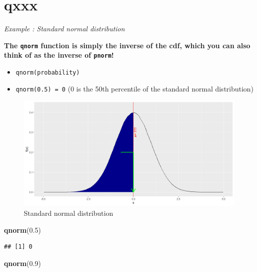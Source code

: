 \documentclass[
]{book}
\newenvironment{Shaded}{\begin{snugshade}}{\end{snugshade}}
\newcommand{\FloatTok}[1]{\textcolor[rgb]{0.00,0.00,0.81}{#1}}
\newcommand{\FunctionTok}[1]{\textcolor[rgb]{0.13,0.29,0.53}{\textbf{#1}}}
\newcommand{\NormalTok}[1]{#1}
\begin{document}
\hypertarget{qxxx}{%
\section{qxxx}\label{qxxx}}

\emph{Example : Standard normal distribution}

\textbf{The \texttt{qnorm} function is simply the inverse of the cdf, which you can also think of as the inverse of \texttt{pnorm}!}

\begin{itemize}
\item
  \texttt{qnorm(probability)}
\item
  \texttt{qnorm(0.5)\ =\ 0} (0 is the 50th percentile of the standard normal distribution)
\end{itemize}

\begin{figure}

{\centering \includegraphics{figure/norm1b-1} 

}

\caption{Standard normal distribution}\label{fig:norm1b}
\end{figure}

\begin{Shaded}
\begin{Highlighting}[]
\FunctionTok{qnorm}\NormalTok{(}\FloatTok{0.5}\NormalTok{)}
\end{Highlighting}
\end{Shaded}

\begin{verbatim}
## [1] 0
\end{verbatim}

\begin{Shaded}
\begin{Highlighting}[]
\FunctionTok{qnorm}\NormalTok{(}\FloatTok{0.9}\NormalTok{)}
\end{Highlighting}
\end{Shaded}
\end{document}

